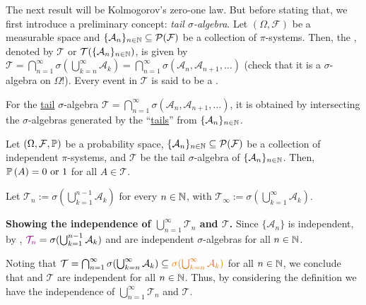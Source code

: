 \begin{enumerate}
The next result will be Kolmogorov's zero-one law. But before stating that, we
first introduce a preliminary concept: \emph{tail \(\sigma\)-algebra}. Let
\((\Omega,\mathcal{F})\) be a measurable space and
\(\{\mathcal{A}_n\}_{n\in\mathbb{N}}\subseteq \mathcal{P}(\mathcal{F})\) be a
collection of \(\pi\)-systems. Then, the  , denoted by \(\mathcal{T}\) or \(\mathcal{T}(\{\mathcal{A}_n\}_{n\in\mathbb{N}})\), is given by
\(\mathcal{T}=\bigcap_{n=1}^{\infty}\sigma(\bigcup_{k=n}^{\infty}\mathcal{A}_k)
=\bigcap_{n=1}^{\infty}\sigma(\mathcal{A}_n,\mathcal{A}_{n+1},\dotsc)\) (check
that it is a \(\sigma\)-algebra on \(\Omega\)!). Every event in \(\mathcal{T}\)
is said to be a .
\begin{intuition}
For the \underline{tail} \(\sigma\)-algebra
\(\mathcal{T}=\bigcap_{n=1}^{\infty}\sigma(\mathcal{A}_n,\mathcal{A}_{n+1},\dotsc)\),
it is obtained by intersecting the \(\sigma\)-algebras generated by the
``\underline{tails}'' from \(\{\mathcal{A}_n\}_{n\in\mathbb{N}}\).
\end{intuition}
\begin{theorem}
\label{thm:kolmogorov-zero-one}
Let \((\Omega,\mathcal{F},\mathbb{P})\) be a probability space,
\(\{\mathcal{A}_n\}_{n\in\mathbb{N}}\subseteq \mathcal{P}(\mathcal{F})\) be a
collection of independent \(\pi\)-systems, and \(\mathcal{T}\) be the tail
\(\sigma\)-algebra of \(\{\mathcal{A}_n\}_{n\in\mathbb{N}}\). Then,
\(\mathbb{P}\left(A\right)=0\text{ or }1\) for all \(A\in\mathcal{T}\).
\end{theorem}
\begin{pf}
Let \(\mathcal{T}_n:=\sigma(\bigcup_{k=1}^{n-1}\mathcal{A}_k)\) for every \(n\in\mathbb{N}\), with
\(\mathcal{T}_{\infty}:=\sigma(\bigcup_{k=1}^{\infty}\mathcal{A}_k)\).

\textbf{Showing the independence of \(\bigcup_{n=1}^{\infty}\mathcal{T}_n\) and \(\mathcal{T}\).}
Since \(\{\mathcal{A}_{n}\}\) is independent, by ,
\(\vc{\mathcal{T}_n}=\sigma(\bigcup_{k=1}^{n-1}\mathcal{A}_k)\) and
 are independent
\(\sigma\)-algebras for all \(n\in\mathbb{N}\).

Noting that \(\mathcal{T}=\bigcap_{n=1}^{\infty}\sigma(\bigcup_{k=n}^{\infty}\mathcal{A}_k)
\subseteq\orc{\sigma(\bigcup_{k=n}^{\infty}\mathcal{A}_k)}\) for all \(n\in\mathbb{N}\),
we conclude that  and \(\mathcal{T}\) are independent for all \(n\in\mathbb{N}\).
Thus, by considering the definition we have the independence of
\(\bigcup_{n=1}^{\infty}\mathcal{T}_n\) and \(\mathcal{T}\).


\end{pf}
\end{enumerate}
